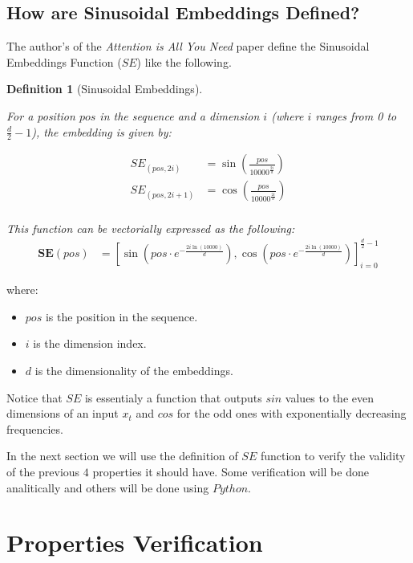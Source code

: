 \documentclass{article}
\newtheorem{definition}{Definition}[section]
\begin{document}
\subsection{How are Sinusoidal Embeddings Defined?}

The author's of the \textit{Attention is All You Need} paper define the Sinusoidal Embeddings Function ($SE$) like the following.

\begin{definition}[Sinusoidal Embeddings]
	\label{def:sin_embedding}
	
	For a position \( pos \) in the sequence and a dimension \( i \) (where \( i \) ranges from 0 to \( \frac{d}{2}-1 \)), the embedding is given by:
	
	\begin{align}
		SE_{(pos, 2i)} &= \sin\left(\frac{pos}{10000^{\frac{2i}{d}}}\right) \\
		SE_{(pos, 2i+1)} &= \cos\left(\frac{pos}{10000^{\frac{2i}{d}}}\right) \\
	\end{align}
	
	This function can be vectorially expressed as the following: 
	\begin{align}
		\mathbf{SE}(pos) &= \left[ \sin\left(pos \cdot e^{- \frac{2i \ln(10000)}{d}}\right), \cos\left(pos \cdot e^{- \frac{2i \ln(10000)}{d}}\right) \right]_{i=0}^{\frac{d}{2}-1}
	\end{align}
	

\end{definition}

where:

\begin{itemize}
	\item \( pos \) is the position in the sequence.
	\item  \( i \) is the dimension index.
	\item  \( d \) is the dimensionality of the embeddings.
\end{itemize}


Notice that $SE$ is essentialy a function that outputs $sin$ values to the even dimensions of an input $x_t$ and $cos$ for the odd ones with exponentially decreasing frequencies.


In the next section we will use the definition of  $SE$ function to verify the validity of the previous $4$ properties it should have. Some verification will be done analitically and others will be done using $Python$.

\section{Properties Verification}
\end{document}
